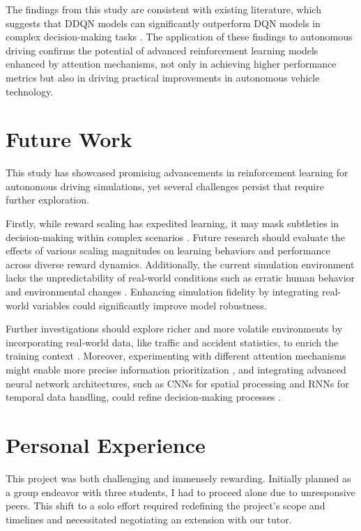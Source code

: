 \documentclass{article}
\begin{document}
The findings from this study are consistent with existing literature, which suggests that DDQN models can significantly outperform DQN models in complex decision-making tasks \citep{8500630}. The application of these findings to autonomous driving confirms the potential of advanced reinforcement learning models enhanced by attention mechanisms, not only in achieving higher performance metrics but also in driving practical improvements in autonomous vehicle technology.

\section{Future Work}

This study has showcased promising advancements in reinforcement learning for autonomous driving simulations, yet several challenges persist that require further exploration.

Firstly, while reward scaling has expedited learning, it may mask subtleties in decision-making within complex scenarios \citep{silver2016mastering}. Future research should evaluate the effects of various scaling magnitudes on learning behaviors and performance across diverse reward dynamics. Additionally, the current simulation environment lacks the unpredictability of real-world conditions such as erratic human behavior and environmental changes \citep{dosovitskiy2017carla}. Enhancing simulation fidelity by integrating real-world variables could significantly improve model robustness.

Further investigations should explore richer and more volatile environments by incorporating real-world data, like traffic and accident statistics, to enrich the training context \citep{bojarski2016end}. Moreover, experimenting with different attention mechanisms might enable more precise information prioritization \citep{DBLP:journals/corr/VaswaniSPUJGKP17}, and integrating advanced neural network architectures, such as CNNs for spatial processing and RNNs for temporal data handling, could refine decision-making processes \citep{lecun2015deep}.


\section{Personal Experience}

This project was both challenging and immensely rewarding. Initially planned as a group endeavor with three students, I had to proceed alone due to unresponsive peers. This shift to a solo effort required redefining the project's scope and timelines and necessitated negotiating an extension with our tutor.
\end{document}
